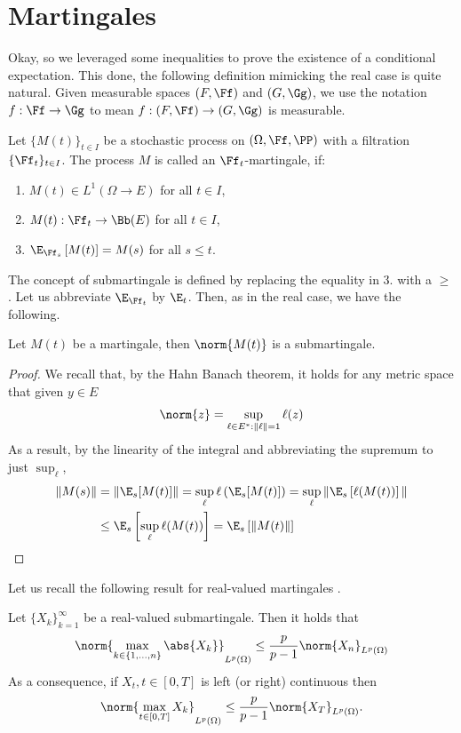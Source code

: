 \documentclass[
    a4paper,
    DIV=14,
    abstract=true,
    numbers=noenddot
]{scrartcl}
\begin{document}
\section{Martingales}
Okay, so we leveraged some inequalities to prove the existence of a conditional expectation. This done, the following definition mimicking the real case is quite natural. Given measurable spaces $(F,\Ff)$ and $(G,\Gg)$, we use the notation $f: \Ff \to \Gg$ to mean $f:(F,\Ff)\to (G,\Gg)$ is measurable.
\begin{definition}
	Let $\{M(t)\}_{t\in I}$ be a stochastic process on $(\Omega, \Ff, \PP)$ with a filtration $\{\Ff_{t}\}_{t \in I}$. The process $M$ is called an $\Ff_{t}$-martingale, if:
	\begin{enumerate}
		\item $M(t)\in L^1(\Omega\to E)$ for all $t\in I$,
		\item $M(t):\Ff_{t} \to \Bb(E)$ for all $t\in I$,
		\item $\E_{\Ff_{s}}\left[M(t)\right]=M(s)$ for all $s \leq t$.
	\end{enumerate}
\end{definition}
The concept of submartingale is  defined by replacing the equality in 3. with a $\geq$. Let us abbreviate $\E_{\Ff_t}$ by $\E_t$. Then, as in the real case, we have the following.
\begin{lemma}\label{lem:norm_is_submart}
	Let $M(t)$ be a martingale, then $\norm{M(t)}$ is a submartingale.
\end{lemma}
\begin{proof}
	We recall that, by the Hahn Banach theorem, it holds for any metric space that given $y\in E$
	\begin{equation*}
		\norm{z}=\sup_{\ell\in E^*:\|\ell\|=1}\ell(z)
	\end{equation*}
	As a result, by the linearity of the integral and abbreviating the supremum to just $\sup_\ell$,
	\begin{align*}
		\|M(s)\|&=\|\E_{s}[M(t)]\|= \sup_\ell \ell\left(\E_{s}[M(t)]\right)=\sup_\ell\|{\E_{s}\left[\ell(M(t))\right]\|}\\
		&\leq \E_{s}\left[\sup_\ell\ell(M(t))\right]=\E_{s}\left[\|M(t)\|\right]
	\end{align*}
\end{proof}
Let us recall the following result for real-valued martingales \cite[Theorem 3.2.6]{ccinlar2011probability}.
\begin{lemma}
	Let $\{X_k\}_{k=1}^\infty$ be a real-valued submartingale. Then it holds that
	\begin{equation*}
		\norm{\max_{k\in\{1,...,n\}}\abs{X_k}}_{L^p(\Omega)}\leq \frac{p}{p-1}\norm{X_n}_{L^p(\Omega)}
	\end{equation*}
	As a consequence, if $X_t,t\in[0,T]$ is left (or right) continuous then
	\begin{equation*}
		\norm{\max_{t\in[0,T]}X_k}_{L^p(\Omega)}\leq \frac{p}{p-1}\norm{X_T}_{L^p(\Omega)}.
	\end{equation*}
\end{lemma}
\end{document}
